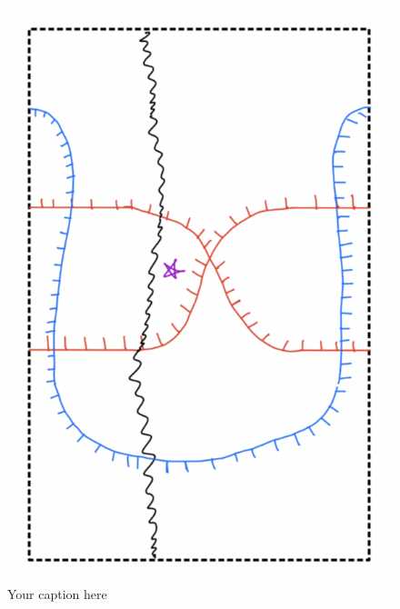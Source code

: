 \begin{figure}[H] %
    \centering
    \includegraphics[scale = 0.95]{diagrams/lemma10/13.png} %
    \caption{Your caption here}
    \label{fig:your-label}
\end{figure}

